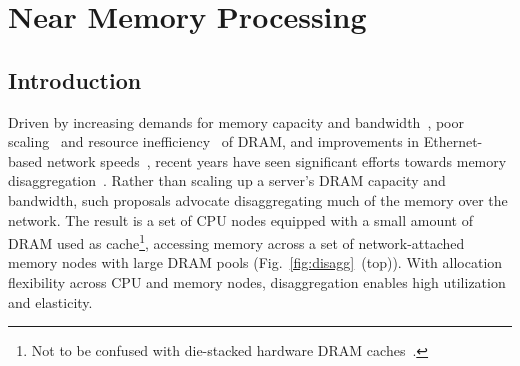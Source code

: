 
\section{Near Memory Processing}

\subsection{Introduction}

Driven by increasing demands for memory capacity and bandwidth~\cite{scuba, cachelib, tao, memcache, flighttracker, twittercache, spark}, poor scaling~\cite{memscaling2, memscaling3, memscaling1} and resource inefficiency~\cite{infiniswap, memoverprovisioning} of DRAM, and improvements in Ethernet-based network speeds~\cite{terabitethernet, remotememory}, recent years have seen significant efforts towards memory disaggregation~\cite{fastswap, memdisagg1, infiniswap, mind, legoos}. Rather than scaling up a server's DRAM capacity and bandwidth, such proposals advocate disaggregating much of the memory over the network. The result is a set of CPU nodes equipped with a small amount of DRAM used as cache\footnote{Not to be confused with die-stacked hardware DRAM caches~\cite{jevdjic2013stacked, jevdjic2014unison, young2018accord}.}, accessing memory across a set of network-attached memory nodes with large DRAM pools (Fig.~\ref{fig:disagg}~(top)). With allocation flexibility across CPU and memory nodes, disaggregation enables high utilization and elasticity.


